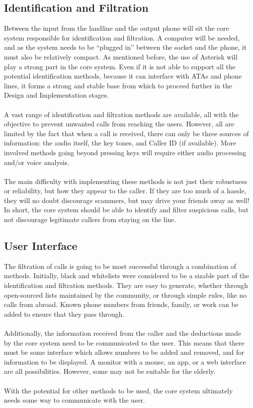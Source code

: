 \documentclass[main.tex]{subfiles}
\begin{document}
\subsection{Identification and Filtration}
Between the input from the landline and the output phone will sit the core system responsible for identification and filtration. A computer will be needed, and as the system needs to be ``plugged in'' between the socket and the phone, it must also be relatively compact. As mentioned before, the use of Asterisk will play a strong part in the core system. Even if it is not able to support all the potential identification methods, because it can interface with ATAs and phone lines, it forms a strong and stable base from which to proceed further in the Design and Implementation stages.
\\\\
A vast range of identification and filtration methods are available, all with the objective to prevent unwanted calls from reaching the users. However, all are limited by the fact that when a call is received, there can only be three sources of information: the audio itself, the key tones, and Caller ID (if available). More involved methods going beyond pressing keys will require either audio processing and/or voice analysis.
\\\\
The main difficulty with implementing these methods is not just their robustness or reliability, but how they appear to the caller. If they are too much of a hassle, they will no doubt discourage scammers, but may drive your friends away as well! In short, the core system should be able to identify and filter suspicious calls, but not discourage legitimate callers from staying on the line.

\subsection{User Interface}
The filtration of calls is going to be most successful through a combination of methods. Initially, black and whitelists were considered to be a sizable part of the identification and filtration methods. They are easy to generate, whether through open-sourced lists maintained by the community, or through simple rules, like no calls from abroad. Known phone numbers from friends, family, or work can be added to ensure that they pass through.
\\\\
Additionally, the information received from the caller and the deductions made by the core system need to be communicated to the user. This means that there must be some interface which allows numbers to be added and removed, and for information to be displayed. A monitor with a mouse, an app, or a web interface are all possibilities. However, some may not be suitable for the elderly.
\\\\
With the potential for other methods to be used, the core system ultimately needs some way to communicate with the user.
\end{document}
